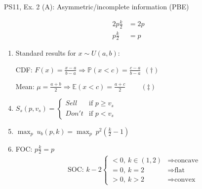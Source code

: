 \begin{frame}{PS11, Ex. 2 (A): Asymmetric/incomplete information (PBE)}
\begin{multicols}{2}
\begin{align*}
        2p\frac{k}{2}&=2p\\
        p\frac{k}{2}&=p
      \end{align*}
      \vfill\null\columnbreak
      \begin{enumerate}
        \item Standard results for $x\sim U(a, b):$
        \item[CDF:] $F(x)=\frac{x-a}{b-a}\Rightarrow\mathbb{P}(x<c)=\frac{c-a}{b-a}\ \ (\dagger)$
        \item[Mean:] $\mu=\frac{a+b}{2}\Rightarrow\mathbb{E}(x<c)=\frac{a+c}{2}\quad\quad\ (\ddagger)$
        \item $S_s(p,v_s)=\left\{\begin{array}{ll}
          Sell  & \text{if }p\geq v_s \\
          Don't & \text{if }p < v_s
        \end{array}\right.$
        \item $\displaystyle{\max_p}\ u_b(p,k)=\displaystyle{\max_p}\ p^2\left(\frac{k}{2}-1\right)$
        \item FOC: $p\frac{k}{2}=p$\vspace{-6pt}
        \begin{align*}
          \text{SOC: }k-2\left\{\begin{array}{ll}
              <0,\ k\in(1,2)&\Rightarrow\text{concave}\\
              =0,\ k=2&\Rightarrow\text{flat}\\
              >0,\ k>2&\Rightarrow\text{convex}
          \end{array}\right.
        \end{align*}
      \end{enumerate}
      \vfill\null
    \end{multicols}
\end{frame}

